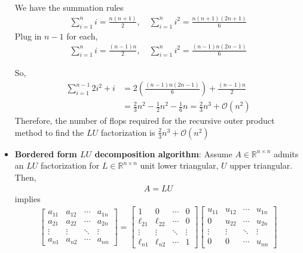 \documentclass{report}
\begin{document}
\begin{itemize}
            \begin{remark}
                We have the summation rules
                \begin{align*}
                    \sum_{i=1}^{n} i = \frac{n(n+1)}{2}, \quad \sum_{i=1}^{n} i^{2} = \frac{n(n+1)(2n+1)}{6}
                \end{align*}
                Plug in $n-1$ for each,
                \begin{align*}
                   \sum_{i=1}^{n} i = \frac{(n-1)n}{2}, \quad \sum_{i=1}^{n} i^{2} = \frac{(n-1)n(2n-1)}{6} 
                \end{align*}
            \end{remark}
            So,
            \begin{align*}
                \sum_{i=1}^{n-1} 2i^{2} + i &= 2\left(\frac{(n-1)n(2n-1)}{6}\right) + \frac{(n-1)n}{2} \\
                                            &= \frac{2}{3}n^{2} -\frac{1}{2}n^{2} - \frac{1}{6}n = \frac{2}{3}n^{3} + \mathcal{O}(n^{2})
            \end{align*}
            Therefore, the number of flops required for the recursive outer product method to find the $LU$ factorization is $\frac{2}{3}n^{3} + \mathcal{O}(n^{2}) $
        \item \textbf{Bordered form $LU$ decomposition algorithm}:
            Assume $A \in \mathbb{R}^{n\times n }$ admits an $LU$ factorization for $L\in \mathbb{R}^{n\times n}$ unit lower triangular, $U$ upper triangular. Then,
            \begin{align*}
                A = LU
            \end{align*}
            implies
            \begin{align*}
                \begin{bmatrix} a_{11} & a_{12} & \cdots & a_{1n} \\ a_{21} & a_{22} & \cdots & a_{2n} \\ \vdots & \vdots & \ddots & \vdots \\ a_{n1} & a_{n2} & \cdots & a_{nn} \end{bmatrix} = 
                \begin{bmatrix} 1 & 0 & \cdots & 0 \\ \ell_{21} & \ell_{22} & \cdots & 0 \\ \vdots & \vdots & \ddots & \vdots \\ \ell_{n1} & \ell_{n2} & \cdots & 1 \end{bmatrix}
                \begin{bmatrix} u_{11} & u_{12} & \cdots & u_{1n} \\ 0 & u_{22} & \cdots & u_{2n} \\ \vdots & \vdots & \ddots & \vdots \\ 0 & 0 & \cdots & u_{nn} \end{bmatrix}

\end{align*}
\end{itemize}
\end{document}

